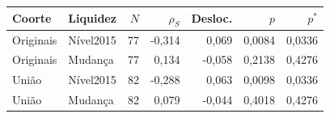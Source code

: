 \begin{tabular}{llrrrrr}
\toprule
Coorte & Liquidez & $N$ & $\rho_S$ & Desloc. & $p$ & $p^*$\\
\midrule
Originais & Nível2015 & 77 & -0,314 & 0,069 & 0,0084 & 0,0336\\
Originais & Mudança & 77 & 0,134 & -0,058 & 0,2138 & 0,4276\\
União & Nível2015 & 82 & -0,288 & 0,063 & 0,0098 & 0,0336\\
União & Mudança & 82 & 0,079 & -0,044 & 0,4018 & 0,4276\\
\bottomrule
\end{tabular}
